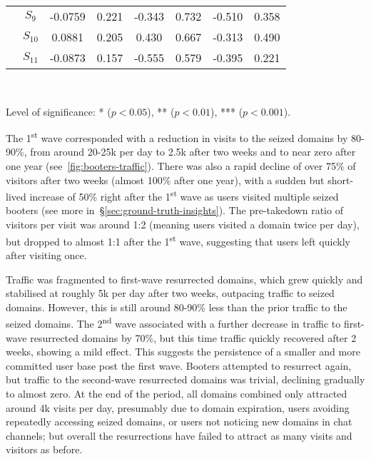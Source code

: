 \documentclass[letterpaper,twocolumn,10pt]{article}
\begin{document}
\begin{table}[t]
\begin{tabular}{lccccccc}
    & $S_{9}$ &  -0.0759 &  0.221 & -0.343 &  0.732 &  -0.510 &   0.358\\
    & $S_{10}$ &  0.0881 &  0.205 &  0.430 &  0.667 &  -0.313 &   0.490\\
    & $S_{11}$ & -0.0873 &  0.157 & -0.555 &  0.579 &  -0.395 &   0.221\\
    \bottomrule
\end{tabular}
\\{\vspace{1mm}\hspace{2mm}\raggedright 
\footnotesize{Level of significance: * ($p < 0.05$), ** ($p < 0.01$), *** ($p < 0.001$).} \par}
\label{tab:nbr-composition-hopscotch}
\end{table}
 The 1\textsuperscript{st} wave corresponded with a reduction in visits to the seized domains by 80-90\%, from around 20-25k per day to 2.5k after two weeks and to near zero after one year (see~\autoref{fig:booters-traffic}). There was also a rapid decline of over 75\% of visitors after two weeks (almost 100\% after one year), with a sudden but short-lived increase of 50\% right after the 1\textsuperscript{st} wave as users visited multiple seized booters (see more in~\S\ref{sec:ground-truth-insights}). The pre-takedown ratio of visitors per visit was around 1:2 (meaning users visited a domain twice per day), but dropped to almost 1:1 after the 1\textsuperscript{st} wave, suggesting that users left quickly after visiting once.

Traffic was fragmented to first-wave resurrected domains, which grew quickly and stabilised at roughly 5k per day after two weeks, outpacing traffic to seized domains. However, this is still around 80-90\% less than the prior traffic to the seized domains. The 2\textsuperscript{nd} wave associated with a further decrease in traffic to first-wave resurrected domains by 70\%, but this time traffic quickly recovered after 2 weeks, showing a mild effect. This suggests the persistence of a smaller and more committed user base post the first wave. Booters attempted to resurrect again, but traffic to the second-wave resurrected domains was trivial, declining gradually to almost zero. At the end of the period, all domains combined only attracted around 4k visits per day, presumably due to domain expiration, users avoiding repeatedly accessing seized domains, or users not noticing new domains in chat channels; but overall the resurrections have failed to attract as many visits and visitors as before.
\end{document}
